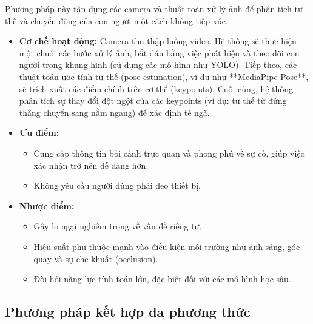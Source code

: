 Phương pháp này tận dụng các camera và thuật toán xử lý ảnh để phân tích tư thế và chuyển động của con người một cách không tiếp xúc.
\begin{itemize}
    \item \textbf{Cơ chế hoạt động:} Camera thu thập luồng video. Hệ thống sẽ thực hiện một chuỗi các bước xử lý ảnh, bắt đầu bằng việc phát hiện và theo dõi con người trong khung hình (sử dụng các mô hình như YOLO). Tiếp theo, các thuật toán ước tính tư thế (pose estimation), ví dụ như **MediaPipe Pose**, sẽ trích xuất các điểm chính trên cơ thể (keypoints). Cuối cùng, hệ thống phân tích sự thay đổi đột ngột của các keypoints (ví dụ: tư thế từ đứng thẳng chuyển sang nằm ngang) để xác định té ngã.
    \item \textbf{Ưu điểm:} 
    \begin{itemize}
        \item Cung cấp thông tin bối cảnh trực quan và phong phú về sự cố, giúp việc xác nhận trở nên dễ dàng hơn.
        \item Không yêu cầu người dùng phải đeo thiết bị.
    \end{itemize}
    \item \textbf{Nhược điểm:}
    \begin{itemize}
        \item Gây lo ngại nghiêm trọng về vấn đề riêng tư.
        \item Hiệu suất phụ thuộc mạnh vào điều kiện môi trường như ánh sáng, góc quay và sự che khuất (occlusion).
        \item Đòi hỏi năng lực tính toán lớn, đặc biệt đối với các mô hình học sâu.
    \end{itemize}
\end{itemize}

\subsection{Phương pháp kết hợp đa phương thức}

